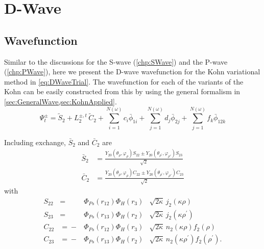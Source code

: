 \documentclass[Dissertation.tex]{subfiles}
\begin{document}
\chapter{D-Wave}
\label{chp:DWave}


\section{Wavefunction}
\label{sec:DWaveFn}

Similar to the discussions for the S-wave (\cref{chp:SWave}) and the P-wave
(\cref{chp:PWave}), here we present the D-wave wavefunction for the Kohn
variational method in \cref{eq:DWaveTrial}. The wavefunction for each of the 
variants of the Kohn can be easily constructed from this by using the general
formalism in \cref{sec:GeneralWave,sec:KohnApplied}.
\begin{equation}
\Psi_t^\pm = \widetilde{S}_2 + L_2^{\pm,t} \, \widetilde{C}_2 + \sum_{i=1}^{N(\omega)} c_i \bar{\phi}_{1i} + \sum_{j=1}^{N(\omega)} d_j \bar{\phi}_{2j} + \sum_{j=1}^{N(\omega)} f_k \bar{\phi}_{12k}
\label{eq:DWaveTrial}
\end{equation}

\noindent Including exchange, $\bar{S}_2$ and $\bar{C}_2$ are
\begin{subequations}
\label{eq:DWaveSandCBar}
\begin{align}
\bar{S}_2 &= \frac{Y_{20}(\theta_\rho,\varphi_\rho)S_{22} \pm Y_{20}(\theta_{\rho^\prime},\varphi_{\rho'})S_{23} }{\sqrt{2}} \label{eq:DWaveSBar} \\
\bar{C}_2 &= \frac{Y_{20}(\theta_\rho,\varphi_\rho)C_{22} \pm Y_{20}(\theta_{\rho^\prime},\varphi_{\rho'})C_{23} }{\sqrt{2}} \label{eq:DWaveCBar} 
\end{align}
\end{subequations}
with
\begin{subequations}
\label{eq:DWaveSandC}
\begin{alignat}{2}
S_{22} &={}&\Phi_{Ps}\left(r_{12}\right) \Phi_H\left(r_3\right) &\sqrt{2\kappa} \,j_2\!\left(\kappa\rho\right) \label{eq:DWaveS22Def} \\
S_{23} &={}&\Phi_{Ps}\left(r_{13}\right) \Phi_H\left(r_2\right) &\sqrt{2\kappa} \,j_2\!\left(\kappa\rho^\prime\right) \label{eq:DWaveS23Def} \\
C_{22} &={}-&\Phi_{Ps}\left(r_{12}\right) \Phi_H\left(r_3\right) &\sqrt{2\kappa} \,n_2\!\left(\kappa\rho\right) f_{2}(\rho) \label{eq:DWaveC22Def} \\
C_{23} &={}-&\Phi_{Ps}\left(r_{13}\right) \Phi_H\left(r_2\right) &\sqrt{2\kappa} \,n_2\!\left(\kappa\rho^\prime\right) f_{2}(\rho^\prime). \label{eq:DWaveC23Def}
\end{alignat}
\end{subequations}
\end{document}
